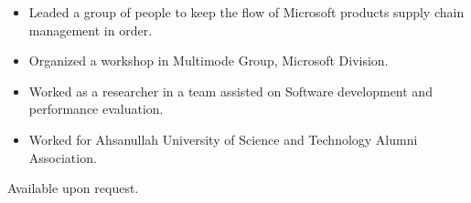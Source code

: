 %
%
%
%
%
%

\begin{itemize}
\tightlist
\item
	Leaded a group of people to keep the flow of Microsoft products supply chain management in order.
\item
	Organized a workshop in Multimode Group, Microsoft Division.
\item
	Worked as a researcher in a team assisted on Software development and performance evaluation.
\item
	Worked for Ahsanullah University of Science and Technology Alumni Association.
\end{itemize}	

Available upon request.
	